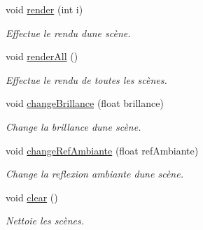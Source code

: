 \begin{DoxyCompactItemize}
void \hyperlink{class_modele_a8c611c3edf341892ceefebd9c3e00136}{render} (int i)
\begin{DoxyCompactList}\small\item\em Effectue le rendu d\textquotesingle{}une scène. \end{DoxyCompactList}\item 
void \hyperlink{class_modele_a78714b95cdb2f63e76c9e122f41e6bbd}{render\+All} ()
\begin{DoxyCompactList}\small\item\em Effectue le rendu de toutes les scènes. \end{DoxyCompactList}\item 
void \hyperlink{class_modele_af105ed94c8a03a7283b4099ef1855976}{change\+Brillance} (float brillance)
\begin{DoxyCompactList}\small\item\em Change la brillance d\textquotesingle{}une scène. \end{DoxyCompactList}\item 
void \hyperlink{class_modele_ab313a52585ff0db49e253b55ddbbc108}{change\+Ref\+Ambiante} (float ref\+Ambiante)
\begin{DoxyCompactList}\small\item\em Change la reflexion ambiante d\textquotesingle{}une scène. \end{DoxyCompactList}\item 
void \hyperlink{class_modele_a1f02ee40382488479be64890e53ea348}{clear} ()
\begin{DoxyCompactList}\small\item\em Nettoie les scènes. \end{DoxyCompactList}\end{DoxyCompactItemize}
